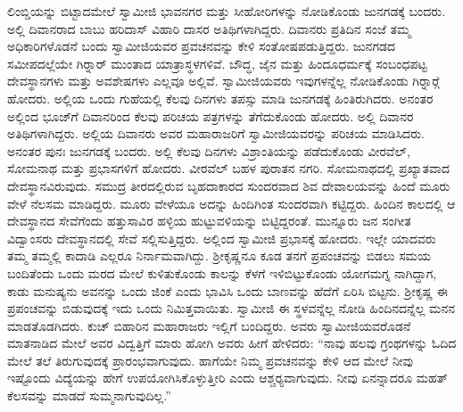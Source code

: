  ಲಿಂಬ್ಡಿಯನ್ನು ಬಿಟ್ಟಾದಮೇಲೆ ಸ್ವಾಮೀಜಿ ಭಾವನಗರ ಮತ್ತು ಸೀಹೋರಿಗಳನ್ನು ನೋಡಿಕೊಂಡು ಜುನಗಡಕ್ಕೆ ಬಂದರು. ಅಲ್ಲಿ ದಿವಾನರಾದ ಬಾಬು ಹರಿದಾಸ್ ವಿಹಾರಿ ದಾಸರ ಅತಿಥಿಗಳಾಗಿದ್ದರು. ದಿವಾನರು ಪ್ರತಿದಿನ ಸಂಜೆ ತಮ್ಮ ಅಧಿಕಾರಿಗಳೊಡನೆ ಬಂದು ಸ್ವಾಮೀಜಿಯವರ ಪ್ರವಚನವನ್ನು ಕೇಳಿ ಸಂತೋಷಪಡುತ್ತಿದ್ದರು. ಜುನಗಡದ ಸಮೀಪದಲ್ಲೆಯೇ ಗಿರ‍್ನಾರ್ ಮುಂತಾದ ಯಾತ್ರಾಸ್ಥಳಗಳಿವೆ. ಬೌದ್ಧ, ಜೈನ ಮತ್ತು ಹಿಂದೂಧರ್ಮಕ್ಕೆ ಸಂಬಂಧಪಟ್ಟ ದೇವಸ್ಥಾನಗಳು ಮತ್ತು ಅವಶೇಷಗಳು ಎಲ್ಲವೂ ಅಲ್ಲಿವೆ. ಸ್ವಾಮೀಜಿಯವರು ಇವುಗಳನ್ನೆಲ್ಲ ನೋಡಿಕೊಂಡು ಗಿರ‍್ನಾರ್‍ಗೆ ಹೋದರು. ಅಲ್ಲಿಯ ಒಂದು ಗುಹೆಯಲ್ಲಿ ಕೆಲವು ದಿನಗಳು ತಪಸ್ಸು ಮಾಡಿ ಜುನಗಡಕ್ಕೆ ಹಿಂತಿರುಗಿದರು. ಅನಂತರ ಅಲ್ಲಿಂದ ಭೂಜ್‍ಗೆ ದಿವಾನರಿಂದ ಕೆಲವು ಪರಿಚಯ ಪತ್ರಗಳನ್ನು ತೆಗೆದುಕೊಂಡು ಹೋದರು. ಅಲ್ಲಿ ದಿವಾನರ ಅತಿಥಿಗಳಾಗಿದ್ದರು. ಅಲ್ಲಿಯ ದಿವಾನರು ಅವರ ಮಹಾರಾಜರಿಗೆ ಸ್ವಾಮೀಜಿಯವರನ್ನು ಪರಿಚಯ ಮಾಡಿಸಿದರು. ಅನಂತರ ಪುನಃ ಜುನಗಡಕ್ಕೆ ಬಂದರು. ಅಲ್ಲಿ ಕೆಲವು ದಿನಗಳು ವಿಶ್ರಾಂತಿಯನ್ನು ಪಡೆದುಕೊಂಡು ವೀರವೆಲ್, ಸೋಮನಾಥ ಮತ್ತು ಪ್ರಭಾಸಗಳಿಗೆ ಹೋದರು. ವೀರವೆಲ್ ಬಹಳ ಪುರಾತನ ನಗರಿ. ಸೋಮನಾಥದಲ್ಲಿ ಪ್ರಖ್ಯಾತವಾದ ದೇವಸ್ಥಾನವಿರುವುದು. ಸಮುದ್ರ ತೀರದಲ್ಲಿರುವ ಬೃಹದಾಕಾರದ ಸುಂದರವಾದ ಶಿವ ದೇವಾಲಯವನ್ನು ಹಿಂದೆ ಮೂರು ವೇಳೆ ನೆಲಸಮ ಮಾಡಿದ್ದರು. ಮೂರು ವೇಳೆಯೂ ಅದನ್ನು ಹಿಂದಿಗಿಂತ ಸುಂದರವಾಗಿ ಕಟ್ಟಿದ್ದರು. ಹಿಂದಿನ ಕಾಲದಲ್ಲಿ ಆ ದೇವಸ್ಥಾನದ ಸೇವೆಗೆಂದು ಹತ್ತುಸಾವಿರ ಹಳ್ಳಿಯ ಹುಟ್ಟುವಳಿಯನ್ನು ಬಿಟ್ಟಿದ್ದರಂತೆ. ಮುನ್ನೂರು ಜನ ಸಂಗೀತ ವಿದ್ವಾಂಸರು ದೇವಸ್ಥಾನದಲ್ಲಿ ಸೇವೆ ಸಲ್ಲಿಸುತ್ತಿದ್ದರು. ಅಲ್ಲಿಂದ ಸ್ವಾಮೀಜಿ ಪ್ರಭಾಸಕ್ಕೆ ಹೋದರು. ಇಲ್ಲೇ ಯಾದವರು ತಮ್ಮ ತಮ್ಮಲ್ಲಿ ಕಾದಾಡಿ ಎಲ್ಲರೂ ನಿರ್ನಾಮವಾಗಿದ್ದು. ಶ‍್ರೀಕೃಷ್ಣನೂ ಕೂಡ ತನಗೆ ಪ್ರಪಂಚವನ್ನು ಬಿಡಲು ಸಮಯ ಬಂದಿತೆಂದು ಒಂದು ಮರದ ಮೇಲೆ ಕುಳಿತುಕೊಂಡು ಕಾಲನ್ನು ಕೆಳಗೆ ಇಳಿಬಿಟ್ಟುಕೊಂಡು ಯೋಗಮಗ್ನ ನಾಗಿದ್ದಾಗ, ಕಾಡು ಮನುಷ್ಯನು ಅವನನ್ನು ಒಂದು ಜಿಂಕೆ ಎಂದು ಭಾವಿಸಿ ಒಂದು ಬಾಣವನ್ನು ಹೆದೆಗೆ ಏರಿಸಿ ಬಿಟ್ಟನು. ಶ‍್ರೀಕೃಷ್ಣ ಈ ಪ್ರಪಂಚವನ್ನು ಬಿಡುವುದಕ್ಕೆ ಇದು ಒಂದು ನಿಮಿತ್ತವಾಯಿತು. ಸ್ವಾಮೀಜಿ ಈ ಸ್ಥಳವನ್ನೆಲ್ಲ ನೋಡಿ ಹಿಂದಿನದನ್ನೆಲ್ಲ ಮನನ ಮಾಡತೊಡಗಿದರು. ಕುಚ್ ಬಿಹಾರಿನ ಮಹಾರಾಜರು ಇಲ್ಲಿಗೆ ಬಂದಿದ್ದರು. ಅವರು ಸ್ವಾಮೀಜಿಯವರೊಡನೆ ಮಾತನಾಡಿದ ಮೇಲೆ ಅವರ ವಿದ್ವತ್ತಿಗೆ ಮಾರು ಹೋಗಿ ಅವರು ಹೀಗೆ ಹೇಳಿದರು: “ನಾವು ಹಲವು ಗ್ರಂಥಗಳನ್ನು ಓದಿದ ಮೇಲೆ ತಲೆ ತಿರುಗುವುದಕ್ಕೆ ಪ್ರಾರಂಭವಾಗುವುದು. ಹಾಗೆಯೇ ನಿಮ್ಮ ಪ್ರವಚನವನ್ನು ಕೇಳಿ ಆದ ಮೇಲೆ ನೀವು ಇಷ್ಟೊಂದು ವಿದ್ಯೆಯನ್ನು ಹೇಗೆ ಉಪಯೋಗಿಸಿಕೊಳ್ಳುತ್ತೀರಿ ಎಂದು ಆಶ್ಚರ‍್ಯವಾಗುವುದು. ನೀವು ಏನನ್ನಾದರೂ ಮಹತ್ ಕೆಲಸವನ್ನು ಮಾಡದೆ ಸುಮ್ಮನಾಗುವುದಿಲ್ಲ.”

